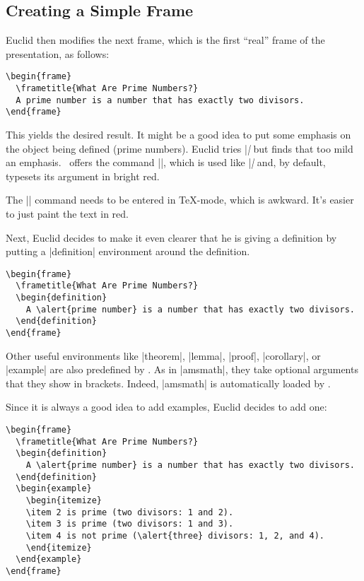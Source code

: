 \subsection{Creating a Simple Frame}

Euclid then modifies the next frame, which is the first ``real'' frame of the presentation, as follows:
\begin{verbatim}
\begin{frame}
  \frametitle{What Are Prime Numbers?}
  A prime number is a number that has exactly two divisors.
\end{frame}
\end{verbatim}
This yields the desired result. It might be a good idea to put some emphasis on the object being defined (prime numbers). Euclid tries |\emph| but finds that too mild an emphasis. \beamer\ offers the command |\alert|, which is used like |\emph| and, by default, typesets its argument in bright red.

\lyxnote
The |\alert| command needs to be entered in \TeX-mode, which is awkward. It's easier to just paint the text in red.

Next, Euclid decides to make it even clearer that he is giving a definition by putting a |definition| environment around the definition.
\begin{verbatim}
\begin{frame}
  \frametitle{What Are Prime Numbers?}
  \begin{definition}
    A \alert{prime number} is a number that has exactly two divisors.
  \end{definition}
\end{frame}
\end{verbatim}

Other useful environments like |theorem|, |lemma|, |proof|, |corollary|, or |example| are also predefined by \beamer. As in |amsmath|, they take optional arguments that they show in brackets. Indeed, |amsmath| is automatically loaded by \beamer.

Since it is always a good idea to add examples, Euclid decides to add one:
\begin{verbatim}
\begin{frame}
  \frametitle{What Are Prime Numbers?}
  \begin{definition}
    A \alert{prime number} is a number that has exactly two divisors.
  \end{definition}
  \begin{example}
    \begin{itemize}
    \item 2 is prime (two divisors: 1 and 2).
    \item 3 is prime (two divisors: 1 and 3).
    \item 4 is not prime (\alert{three} divisors: 1, 2, and 4).
    \end{itemize}
  \end{example}
\end{frame}
\end{verbatim}


